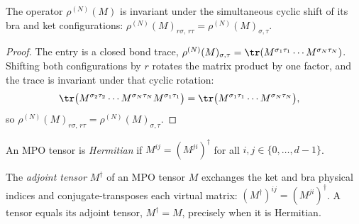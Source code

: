\begin{lemma}
    \label{thm:mpo_translation_invariant}
    \leanok
    The operator $\rho^{(N)}(M)$ is invariant under the simultaneous cyclic shift
    of its bra and ket configurations:
    $\rho^{(N)}(M)_{r\sigma,\,r\tau}=\rho^{(N)}(M)_{\sigma,\tau}$.
\end{lemma}

\begin{proof}\leanok
    The entry is a closed bond trace,
    $\rho^{(N)}(M)_{\sigma,\tau}
        =\tr(M^{\sigma_1\tau_1}\cdots M^{\sigma_N\tau_N})$.
    Shifting both configurations by $r$ rotates the matrix product by one factor,
    and the trace is invariant under that cyclic rotation:
    \begin{align}
        \tr\bigl(        M^{\sigma_2\tau_2}\cdots
        M^{\sigma_N\tau_N}M^{\sigma_1\tau_1}
        \bigr)
         & =
        \tr\bigl(        M^{\sigma_1\tau_1}\cdots M^{\sigma_N\tau_N}
        \bigr),
        \notag
    \end{align}
    so $\rho^{(N)}(M)_{r\sigma,\,r\tau}
        =\rho^{(N)}(M)_{\sigma,\tau}$.
\end{proof}

\begin{definition}\label{def:mpo_hermitian}
    \leanok
    An MPO tensor is \emph{Hermitian} if
    $M^{ij}=(M^{ji})^\dagger$ for all
    $i,j\in\{0,\ldots,d{-}1\}$.
\end{definition}

\begin{definition}\label{def:mpo_adjoint_tensor}
    \leanok
    The \emph{adjoint tensor} $M^\dagger$ of an MPO tensor $M$ exchanges the
    ket and bra physical indices and conjugate-transposes each virtual
    matrix: $(M^\dagger)^{ij}=(M^{ji})^\dagger$.
    A tensor equals its adjoint tensor, $M^\dagger=M$, precisely when it
    is Hermitian.
\end{definition}

